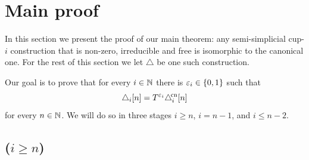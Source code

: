 
\section{Main proof}\label{s:proof}

In this section we present the proof of our main theorem: any semi-simplicial \mbox{cup-$i$} construction that is non-zero, irreducible and free is isomorphic to the canonical one.
For the rest of this section we let $\triangle$ be one such construction.

Our goal is to prove that for every $i\in\mathbb{N}$ there is $\varepsilon_i\in\{0,1\}$ such that
\[
\triangle_i[n]=T^{\varepsilon_i}\triangle^{\!\mathrm{cn}}_i[n]
\]
for every $n\in\mathbb{N}$.
We will do so in three stages \(i \geq n\), \(i = n - 1\), and \(i \leq n-2\).

\subsection{($i \geq n$)}\label{ss:i_geq_n}

